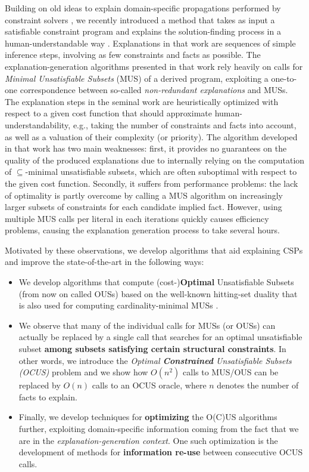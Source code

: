 
Building on old ideas to explain domain-specific propagations performed by constraint solvers  \cite{sqalli1996inference,freuder2001explanation}, we recently introduced a 
method that takes as input a satisfiable constraint program and explains the solution-finding process in a human-understandable way  \cite{ecai/BogaertsGCG20}. 
Explanations in that work are sequences of simple inference steps, involving as few constraints and facts as possible. 
The explanation-generation algorithms presented in that work rely heavily on calls for  \emph{Minimal Unsatisfiable Subsets} (MUS) \cite{marques2010minimal} of a derived program, exploiting a one-to-one correspondence between so-called \emph{non-redundant explanations} and MUSs.
The explanation steps in the seminal work are heuristically optimized with respect to a given cost function that should approximate human-understandability, e.g., taking the number of constraints and facts into account, as well as a valuation of their complexity (or priority). 
The algorithm developed in that work has two main weaknesses: first, it provides no guarantees on the quality of the produced explanations due to internally relying on the computation of $\subseteq$-minimal unsatisfiable subsets, which are often suboptimal with respect to the given cost function. 
Secondly, it suffers from performance problems: the lack of optimality is partly overcome by calling a MUS algorithm on increasingly larger subsets of constraints for each candidate implied fact.
However, using multiple MUS calls per literal in each iterations quickly causes efficiency problems, causing the explanation generation process to take several hours.


Motivated by these observations, we develop algorithms that aid explaining CSPs and improve the state-of-the-art in the following ways: 
\begin{itemize}
 \item We develop algorithms that compute (cost-)\textbf{Optimal} Unsatisfiable Subsets (from now on called OUSs) based on the well-known hitting-set duality that is also used for computing cardinality-minimal MUSs \cite{ignatiev2015smallest,DBLP:conf/kr/SaikkoWJ16}.
\item We observe that many of the individual calls for MUSs (or OUSs) can actually be replaced by a single call that searches for an optimal unsatisfiable subset \textbf{among subsets satisfying certain structural constraints}. In other words, we introduce the \emph{Optimal \textbf{Constrained} Unsatisfiable Subsets (OCUS)} problem and we show how $O(n^2)$ calls to MUS/OUS can be replaced by $O(n)$ calls to an OCUS oracle, where $n$ denotes the number of facts to explain. 
\item Finally, we develop techniques for \textbf{optimizing} the O(C)US algorithms further, exploiting domain-specific information coming from the fact that we are in the  \emph{explanation-generation context}. One such optimization is the development of methods for \textbf{information re-use} between consecutive OCUS calls.
\end{itemize}

